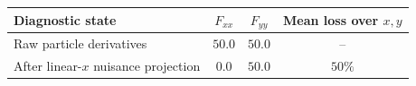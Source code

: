\begin{tabular}{lccc}
\toprule
Diagnostic state & $F_{xx}$ & $F_{yy}$ & Mean loss over $x,y$ \\
\midrule
Raw particle derivatives & $50.0$ & $50.0$ & -- \\
After linear-$x$ nuisance projection & $0.0$ & $50.0$ & $50\%$ \\
\bottomrule
\end{tabular}
